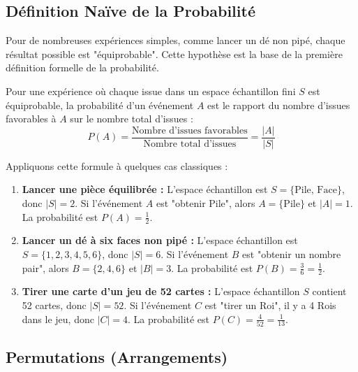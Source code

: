 \subsection{Définition Naïve de la Probabilité}

Pour de nombreuses expériences simples, comme lancer un dé non pipé, chaque résultat possible est "équiprobable". Cette hypothèse est la base de la première définition formelle de la probabilité.

\begin{definitionbox}
Pour une expérience où chaque issue dans un espace échantillon fini $S$ est équiprobable, la probabilité d'un événement $A$ est le rapport du nombre d'issues favorables à $A$ sur le nombre total d'issues :
$$ P(A) = \frac{\text{Nombre d'issues favorables}}{\text{Nombre total d'issues}} = \frac{|A|}{|S|} $$
\end{definitionbox}

Appliquons cette formule à quelques cas classiques :

\begin{examplebox}
\begin{enumerate}
    \item \textbf{Lancer une pièce équilibrée :}
    L'espace échantillon est $S = \{\text{Pile, Face}\}$, donc $|S| = 2$.
    Si l'événement $A$ est "obtenir Pile", alors $A = \{\text{Pile}\}$ et $|A| = 1$.
    La probabilité est $P(A) = \frac{1}{2}$.

    \item \textbf{Lancer un dé à six faces non pipé :}
    L'espace échantillon est $S = \{1, 2, 3, 4, 5, 6\}$, donc $|S| = 6$.
    Si l'événement $B$ est "obtenir un nombre pair", alors $B = \{2, 4, 6\}$ et $|B| = 3$.
    La probabilité est $P(B) = \frac{3}{6} = \frac{1}{2}$.

    \item \textbf{Tirer une carte d'un jeu de 52 cartes :}
    L'espace échantillon $S$ contient 52 cartes, donc $|S| = 52$.
    Si l'événement $C$ est "tirer un Roi", il y a 4 Rois dans le jeu, donc $|C| = 4$.
    La probabilité est $P(C) = \frac{4}{52} = \frac{1}{13}$.
\end{enumerate}
\end{examplebox}

\subsection{Permutations (Arrangements)}

